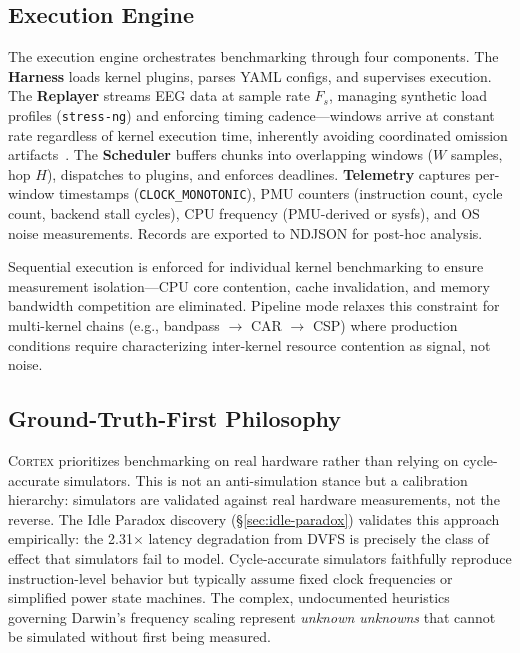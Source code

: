 \documentclass[sigplan,10pt]{acmart}
\newcommand{\cortex}{\textsc{Cortex}}
\begin{document}
\subsection{Execution Engine}

The execution engine orchestrates benchmarking through four components. The \textbf{Harness} loads kernel plugins, parses YAML configs, and supervises execution. The \textbf{Replayer} streams EEG data at sample rate $F_s$, managing synthetic load profiles (\texttt{stress-ng}) and enforcing timing cadence---windows arrive at constant rate regardless of kernel execution time, inherently avoiding coordinated omission artifacts~\cite{tene2015latency}. The \textbf{Scheduler} buffers chunks into overlapping windows ($W$ samples, hop $H$), dispatches to plugins, and enforces deadlines. \textbf{Telemetry} captures per-window timestamps (\texttt{CLOCK\_MONOTONIC}), PMU counters (instruction count, cycle count, backend stall cycles), CPU frequency (PMU-derived or sysfs), and OS noise measurements. Records are exported to NDJSON for post-hoc analysis.

Sequential execution is enforced for individual kernel benchmarking to ensure measurement isolation---CPU core contention, cache invalidation, and memory bandwidth competition are eliminated. Pipeline mode relaxes this constraint for multi-kernel chains (e.g., bandpass $\to$ CAR $\to$ CSP) where production conditions require characterizing inter-kernel resource contention as signal, not noise.

\subsection{Ground-Truth-First Philosophy}

\cortex{} prioritizes benchmarking on real hardware rather than relying on cycle-accurate simulators. This is not an anti-simulation stance but a calibration hierarchy: simulators are validated against real hardware measurements, not the reverse. The Idle Paradox discovery (\S\ref{sec:idle-paradox}) validates this approach empirically: the 2.31$\times$ latency degradation from DVFS is precisely the class of effect that simulators fail to model. Cycle-accurate simulators faithfully reproduce instruction-level behavior but typically assume fixed clock frequencies or simplified power state machines. The complex, undocumented heuristics governing Darwin's frequency scaling represent \emph{unknown unknowns} that cannot be simulated without first being measured.
\end{document}
